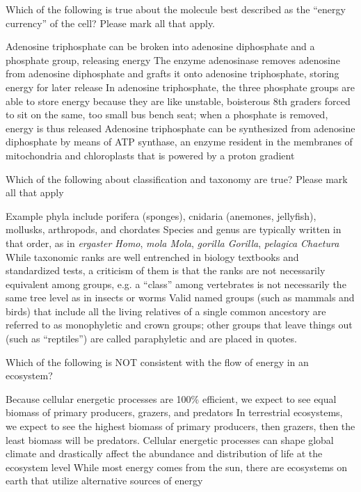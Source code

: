 \documentclass[exam,addpoints,noanswers]{exam}
\begin{document}
\begin{questions}
\question[1] Which of the following is true about the molecule best described as the ``energy currency'' of the cell? Please mark all that apply. 
\begin{choices}
\CorrectChoice Adenosine triphosphate can be broken into adenosine diphosphate and a phosphate group, releasing energy
\choice The enzyme adenosinase removes adenosine from adenosine diphosphate and grafts it onto adenosine triphosphate, storing energy for later release
\CorrectChoice In adenosine triphosphate, the three phosphate groups are able to store energy because they are like unstable, boisterous 8th graders forced to sit on the same, too small bus bench seat; when a phosphate is removed, energy is thus released
\CorrectChoice Adenosine triphosphate can be synthesized from adenosine diphosphate by means of ATP synthase, an enzyme resident in the membranes of mitochondria and chloroplasts that is powered by a proton gradient 
\end{choices}



\question[1] Which of the following about classification and taxonomy are true? Please mark all that apply
\begin{choices}
\CorrectChoice Example phyla include porifera (sponges), cnidaria (anemones, jellyfish), mollusks, arthropods, and chordates 
\choice Species and genus are typically written in that order, as in \emph{ergaster Homo}, \emph{mola Mola}, \emph{gorilla Gorilla}, \emph{pelagica Chaetura}
\CorrectChoice While taxonomic ranks are well entrenched in biology textbooks and standardized tests, a criticism of them is that the ranks are not necessarily equivalent among groups, e.g. a ``class'' among vertebrates is not necessarily the same tree level as in insects or worms
\CorrectChoice Valid named groups (such as mammals and birds) that include all the living relatives of a single common ancestory are referred to as monophyletic and crown groups; other groups that leave things out (such as ``reptiles'') are called paraphyletic and are placed in quotes. 
\end{choices}



\question[1] Which of the following is NOT consistent with the flow of energy in an ecosystem?
\begin{choices}
\CorrectChoice Because cellular energetic processes are 100\% efficient, we expect to see equal biomass of primary producers, grazers, and predators
\choice In terrestrial ecosystems, we expect to see the highest biomass of primary producers, then grazers, then the least biomass will be predators. 
\choice Cellular energetic processes can shape global climate and drastically affect the abundance and distribution of life at the ecosystem level
\choice While most energy comes from the sun, there are ecosystems on earth that utilize alternative sources of energy
\end{choices}




\end{questions}
\end{document}
